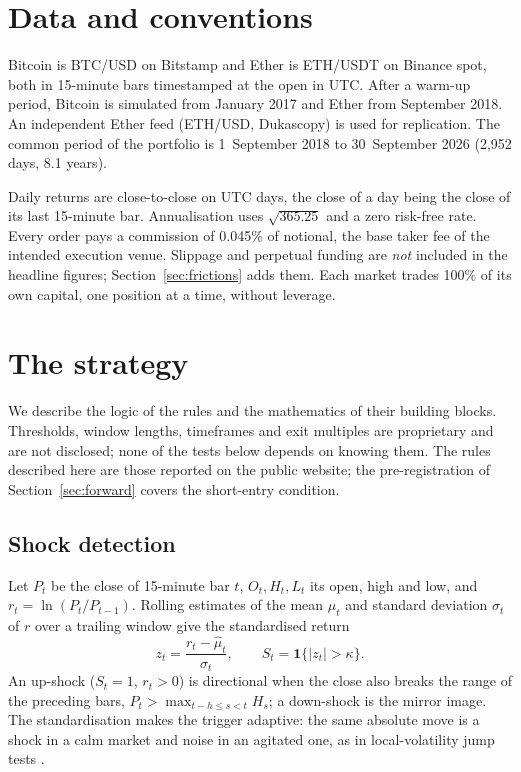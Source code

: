 \documentclass[11pt,a4paper]{article}
\newcommand{\1}{\mathbf{1}}
\begin{document}
\section{Data and conventions}\label{sec:data}

Bitcoin is BTC/USD on Bitstamp and Ether is ETH/USDT on Binance spot, both in 15-minute bars timestamped at the open in UTC. After a warm-up period, Bitcoin is simulated from January 2017 and Ether from September 2018. An independent Ether feed (ETH/USD, Dukascopy) is used for replication. The common period of the portfolio is 1~September 2018 to 30~September 2026 (2{,}952 days, 8.1 years).

Daily returns are close-to-close on UTC days, the close of a day being the close of its last 15-minute bar. Annualisation uses $\sqrt{365.25}$ and a zero risk-free rate. Every order pays a commission of 0.045\% of notional, the base taker fee of the intended execution venue. Slippage and perpetual funding are \emph{not} included in the headline figures; Section~\ref{sec:frictions} adds them. Each market trades 100\% of its own capital, one position at a time, without leverage.

\section{The strategy}\label{sec:strategy}

We describe the logic of the rules and the mathematics of their building blocks. Thresholds, window lengths, timeframes and exit multiples are proprietary and are not disclosed; none of the tests below depends on knowing them. The rules described here are those reported on the public website; the pre-registration of Section~\ref{sec:forward} covers the short-entry condition.

\subsection{Shock detection}

Let $P_t$ be the close of 15-minute bar $t$, $O_t,H_t,L_t$ its open, high and low, and $r_t=\ln(P_t/P_{t-1})$. Rolling estimates of the mean $\hat\mu_t$ and standard deviation $\hat\sigma_t$ of $r$ over a trailing window give the standardised return
\begin{equation}
z_t=\frac{r_t-\hat\mu_t}{\hat\sigma_t},\qquad S_t=\1\{|z_t|>\kappa\}.
\end{equation}
An up-shock ($S_t=1$, $r_t>0$) is directional when the close also breaks the range of the preceding bars, $P_t>\max_{t-h\le s<t}H_s$; a down-shock is the mirror image. The standardisation makes the trigger adaptive: the same absolute move is a shock in a calm market and noise in an agitated one, as in local-volatility jump tests \citep{LeeMykland2008}.
\end{document}
